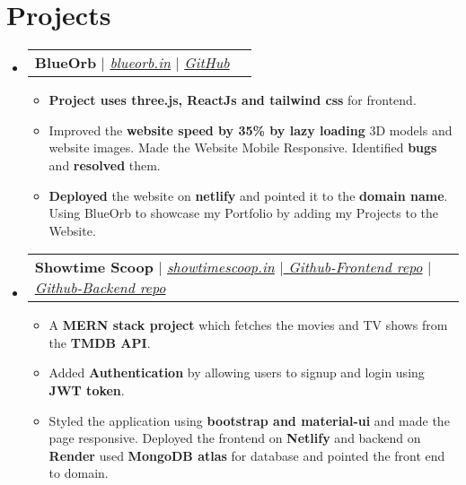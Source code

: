 \documentclass[letterpaper,11pt]{article}
\makeatletter
\newcommand{\resumeItem}[1]{
  \item\small{
    {#1 \vspace{-2pt}}
  }
}
\newcommand{\resumeProjectHeading}[2]{
    \vspace{-2pt}\item
    \begin{tabular*}{0.97\textwidth}{l@{\extracolsep{\fill}}r}
      \small#1 & #2 \\
    \end{tabular*}\vspace{-7pt}
}
\newcommand{\resumeSubHeadingListStart}{\begin{itemize}[leftmargin=0.15in, label={}]}
\newcommand{\resumeSubHeadingListEnd}{\end{itemize}}
\newcommand{\resumeItemListStart}{\begin{itemize}}
\newcommand{\resumeItemListEnd}{\end{itemize}\vspace{-5pt}}
\makeatother
\begin{document}
    


\section{Projects}
    \vspace{3pt}
    \resumeSubHeadingListStart
      
      \resumeProjectHeading
        {\textbf{BlueOrb} $|$ \emph{\href{https://blueorb.in}{\color{blue} blueorb.in}} $|$ \emph{\href{https://github.com/Akash-152000/BlueOrb}{\color{blue}GitHub}}}{}
          \resumeItemListStart
            \resumeItem{\textbf{Project uses three.js, ReactJs and tailwind css} for frontend.}
            \resumeItem{Improved the \textbf{website speed by 35\% by lazy loading}  3D models and website images. Made the Website Mobile Responsive. Identified \textbf{bugs} and \textbf{resolved} them.}
            \resumeItem{\textbf{Deployed} the website on \textbf{netlify} and pointed it to the \textbf{domain name}. Using BlueOrb to showcase my Portfolio by adding my Projects to the Website.}
          \resumeItemListEnd

      
      \resumeProjectHeading
        {\textbf{Showtime Scoop} $|$ \emph{\href{https://showtimescoop.in}{\color{blue} showtimescoop.in}} $|$\emph{\href{https://github.com/Akash-152000/Showtime-Scoop}{\color{blue} Github-Frontend repo}} $|$ \emph{\href{https://github.com/Akash-152000/Server-ShowtimeScoop-}{\color{blue}Github-Backend repo}}}{}
          \resumeItemListStart
            \resumeItem{A \textbf{MERN stack project} which fetches the movies and TV shows from the \textbf{TMDB API}.}
            \resumeItem{Added \textbf{Authentication} by allowing users to signup and login using \textbf{JWT token}.}
            \resumeItem{Styled the application using \textbf{bootstrap and material-ui} and made the page responsive. Deployed the frontend on \textbf{Netlify} and backend on \textbf{Render} used \textbf{MongoDB atlas} for database and pointed the front end to domain.}
          \resumeItemListEnd
      
    \resumeSubHeadingListEnd




        
\end{document}
